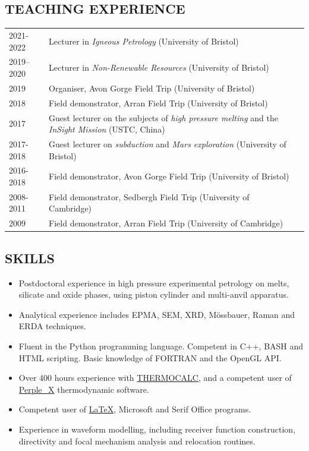 \documentclass[11pt,twoside,a4paper]{article}
\begin{document}
\subsection*{TEACHING EXPERIENCE}
\vspace{-0.5em}
\begin{table}[!h]
\centering
\begin{tabular}{L{2cm} L{13cm} L{2cm}}
  2021-2022 & Lecturer in \emph{Igneous Petrology} (University of Bristol) & \\
  2019--2020 & Lecturer in \emph{Non-Renewable Resources} (University of Bristol) & \\
  2019 & Organiser, Avon Gorge Field Trip (University of Bristol) &\\
  2018 & Field demonstrator, Arran Field Trip (University of Bristol) & \\
  2017 \vfill & Guest lecturer on the subjects of \emph{high pressure melting} and the \emph{InSight Mission} (USTC, China) & \\
  2017-2018 & Guest lecturer on \emph{subduction} and \emph{Mars exploration} (University of Bristol) & \\
  2016-2018 & Field demonstrator, Avon Gorge Field Trip (University of Bristol) & \\
  2008-2011 & Field demonstrator, Sedbergh Field Trip (University of Cambridge) & \\
  2009 & Field demonstrator, Arran Field Trip (University of Cambridge) &
\end{tabular}
\end{table}
\vspace{-1.5em}

\subsection*{SKILLS}
\begin{itemize}
\item Postdoctoral experience in high pressure experimental petrology on melts, silicate and oxide phases, using piston cylinder and multi-anvil apparatus.
\item Analytical experience includes EPMA, SEM, XRD, M\"ossbauer, Raman and ERDA techniques.
\item Fluent in the Python programming language. Competent in C++, BASH and HTML scripting. Basic knowledge of FORTRAN and the OpenGL API.
\item Over 400 hours experience with \href{http:www.metamorph.geo.unimainz.de/thermocalc/}{THERMOCALC}, and a competent user of \href{http:www.perplex.ethz.ch/}{Perple\_X} thermodynamic software.
\item Competent user of \href{http://www.latex-project.org/}{\LaTeX}, Microsoft and Serif Office programs.
\item Experience in waveform modelling, including receiver function construction, directivity and focal mechanism analysis and relocation routines.
\end{itemize}
\end{document}
